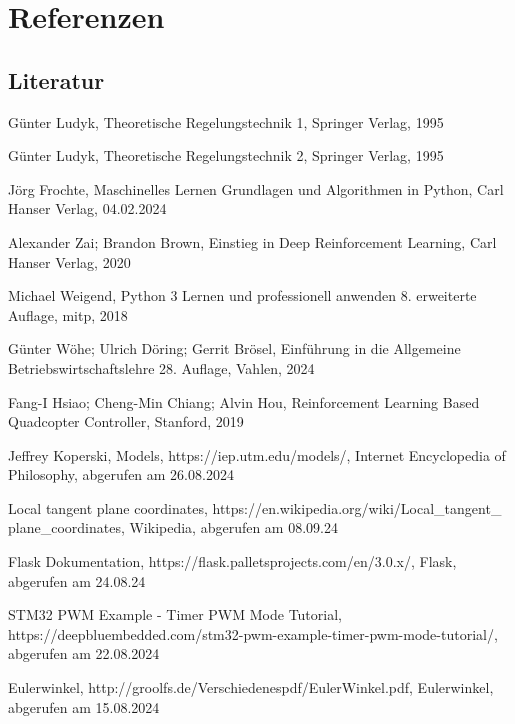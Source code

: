 \section{Referenzen}
\subsection{Literatur}
\begin{enumerate}[label=\textbf{[\arabic*]}]
	\item \label{link:Regelungstechnik1}Günter Ludyk, Theoretische Regelungstechnik 1, Springer Verlag, 1995
	\item \label{link:Regelungstechnik2}Günter Ludyk, Theoretische Regelungstechnik 2, Springer Verlag, 1995
	\item \label{link:MaschinellesLernen}Jörg Frochte, Maschinelles Lernen Grundlagen und Algorithmen in Python, Carl Hanser Verlag, 04.02.2024
	\item \label{link:DeepReinforcementLearning}Alexander Zai; Brandon Brown, Einstieg in Deep Reinforcement Learning, Carl Hanser Verlag, 2020 
	\item \label{link:Python}Michael Weigend, Python 3 Lernen und professionell anwenden 8. erweiterte Auflage, mitp, 2018 
	\item \label{link:Betriebswirtschaftslehre}Günter Wöhe; Ulrich Döring; Gerrit Brösel, Einführung in die Allgemeine Betriebswirtschaftslehre 28. Auflage, Vahlen, 2024
	\item \label{link:ReinforcementLearningQuadcopter}Fang-I Hsiao; Cheng-Min Chiang; Alvin Hou, Reinforcement Learning Based Quadcopter
	Controller, Stanford, 2019
	\item \label{link:Modelle}Jeffrey Koperski, Models, https://iep.utm.edu/models/, Internet Encyclopedia of Philosophy, abgerufen am 26.08.2024
	\item \label{link:LocalTangent}Local tangent plane coordinates, https://en.wikipedia.org/wiki/Local\_tangent\_\\plane\_coordinates, Wikipedia, abgerufen am 08.09.24
	\item \label{link:Flask}Flask Dokumentation, https://flask.palletsprojects.com/en/3.0.x/, Flask, abgerufen am 24.08.24
	\item \label{link:PWM}STM32 PWM Example - Timer PWM Mode Tutorial, https://deepbluembedded.com/stm32-pwm-example-timer-pwm-mode-tutorial/, abgerufen am 22.08.2024
	\item \label{link:Eulerwinkel}Eulerwinkel, http://groolfs.de/Verschiedenespdf/EulerWinkel.pdf, Eulerwinkel, abgerufen am 15.08.2024

\end{enumerate}
